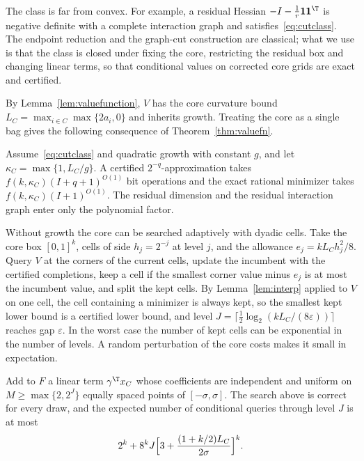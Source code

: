 The class is far from convex. For example, a residual Hessian
$-I-\frac1r\mathbf 1\mathbf 1^\T$ is negative definite with a complete
interaction graph and satisfies~\eqref{eq:cutclass}. The endpoint
reduction and the graph-cut construction are classical; what we use is that
the class is closed under fixing the core, restricting the residual box
and changing linear terms, so that conditional values on corrected core
grids are exact and certified.

By Lemma~\ref{lem:valuefunction}, $V$ has the core curvature bound
$L_C=\max_{i\in C}\max\{2a_i,0\}$ and inherits growth. Treating the core as a
single bag gives the following consequence of Theorem~\ref{thm:valuefn}.

\begin{corollary}\label{cor:cutcore}
Assume~\eqref{eq:cutclass} and quadratic growth with constant $g$, and let
$\kappa_C=\max\{1,L_C/g\}$. A certified $2^{-q}$-approximation takes
$f(k,\kappa_C)(I+q+1)^{O(1)}$ bit operations and the exact rational
minimizer takes $f(k,\kappa_C)(I+1)^{O(1)}$. The residual dimension and the
residual interaction graph enter only the polynomial factor.
\end{corollary}

Without growth the core can be searched adaptively with dyadic cells. Take
the core box $[0,1]^k$, cells of side $h_j=2^{-j}$ at level $j$, and the
allowance $e_j=kL_Ch_j^2/8$. Query $V$ at the corners of the current cells,
update the incumbent with the certified completions, keep a cell if the
smallest corner value minus $e_j$ is at most the incumbent value, and split
the kept cells. By Lemma~\ref{lem:interp} applied to $V$ on one cell, the
cell containing a minimizer is always kept, so the smallest kept lower
bound is a certified lower bound, and level
$J=\lceil\frac12\log_2(kL_C/(8\varepsilon))\rceil$ reaches gap $\varepsilon$.
In the worst case the number of kept cells can be exponential in the number
of levels. A random perturbation of the core costs makes it small in
expectation.

\begin{proposition}\label{prop:smoothed}
Add to $F$ a linear term $\gamma^\T x_C$ whose coefficients are independent
and uniform on $M\ge\max\{2,2^J\}$ equally spaced points of
$[-\sigma,\sigma]$. The search above is correct for every draw, and the
expected number of conditional queries through level $J$ is at most
\[
2^k+8^kJ\Bigl[3+\frac{(1+k/2)L_C}{2\sigma}\Bigr]^k .
\]
\end{proposition}

